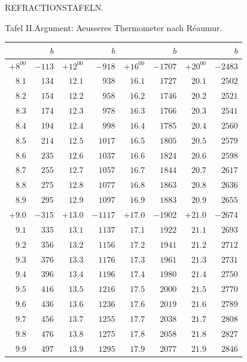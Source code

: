 \begin{center}
{\small REFRACTIONSTAFELN.\par}
\medskip
Tafel II.\quad Argument: Aeusseres Thermometer nach Réaumur.
\medskip
{\fontsize{9}{10.2}\selectfont\setlength{\tabcolsep}{6pt}
\begin{tabular}{r|r||r|r||r|r||r|r}
&$b$&&$b$&&$b$&&$b$\\\hline
$+8^00$ & $-113$ & $+12^00$ & $-918$ & $+16^00$ & $-1707$ & $+20^00$ & $-2483$\\
$8.1$ & $134$ & $12.1$ & $938$ & $16.1$ & $1727$ & $20.1$ & $2502$\\
$8.2$ & $154$ & $12.2$ & $958$ & $16.2$ & $1746$ & $20.2$ & $2521$\\
$8.3$ & $174$ & $12.3$ & $978$ & $16.3$ & $1766$ & $20.3$ & $2541$\\
$8.4$ & $194$ & $12.4$ & $998$ & $16.4$ & $1785$ & $20.4$ & $2560$\\
$8.5$ & $214$ & $12.5$ & $1017$ & $16.5$ & $1805$ & $20.5$ & $2579$\\
$8.6$ & $235$ & $12.6$ & $1037$ & $16.6$ & $1824$ & $20.6$ & $2598$\\
$8.7$ & $255$ & $12.7$ & $1057$ & $16.7$ & $1844$ & $20.7$ & $2617$\\
$8.8$ & $275$ & $12.8$ & $1077$ & $16.8$ & $1863$ & $20.8$ & $2636$\\
$8.9$ & $295$ & $12.9$ & $1097$ & $16.9$ & $1883$ & $20.9$ & $2655$\\[4pt]
$+9.0$ & $-315$ & $+13.0$ & $-1117$ & $+17.0$ & $-1902$ & $+21.0$ & $-2674$\\
$9.1$ & $335$ & $13.1$ & $1137$ & $17.1$ & $1922$ & $21.1$ & $2693$\\
$9.2$ & $356$ & $13.2$ & $1156$ & $17.2$ & $1941$ & $21.2$ & $2712$\\
$9.3$ & $376$ & $13.3$ & $1176$ & $17.3$ & $1961$ & $21.3$ & $2731$\\
$9.4$ & $396$ & $13.4$ & $1196$ & $17.4$ & $1980$ & $21.4$ & $2750$\\
$9.5$ & $416$ & $13.5$ & $1216$ & $17.5$ & $2000$ & $21.5$ & $2770$\\
$9.6$ & $436$ & $13.6$ & $1236$ & $17.6$ & $2019$ & $21.6$ & $2789$\\
$9.7$ & $456$ & $13.7$ & $1255$ & $17.7$ & $2038$ & $21.7$ & $2808$\\
$9.8$ & $476$ & $13.8$ & $1275$ & $17.8$ & $2058$ & $21.8$ & $2827$\\
$9.9$ & $497$ & $13.9$ & $1295$ & $17.9$ & $2077$ & $21.9$ & $2846$\\[4pt]

\end{tabular}}
\end{center}
